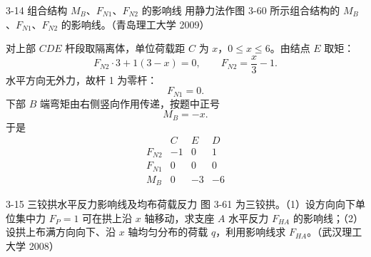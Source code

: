 \begin{problemcard}{3-14 组合结构 \(M_B\)、\(F_{N1}\)、\(F_{N2}\) 的影响线}
用静力法作图 3-60 所示组合结构的 \(M_B\)、\(F_{N1}\)、\(F_{N2}\) 的影响线。（青岛理工大学 2009）
\end{problemcard}

\begin{solutioncard}

对上部 \(CDE\) 杆段取隔离体，单位荷载距 \(C\) 为 \(x\)，\(0\le x\le6\)。由结点 \(E\) 取矩：
\[
  F_{N2}\cdot3+1(3-x)=0,
  \qquad
  F_{N2}=\frac{x}{3}-1.
\]
水平方向无外力，故杆 1 为零杆：
\[
  F_{N1}=0.
\]
下部 \(B\) 端弯矩由右侧竖向作用传递，按题中正号
\[
  M_B=-x.
\]
于是
\[
\begin{array}{c|ccc}
&C&E&D\\ \hline
F_{N2}&-1&0&1\\
F_{N1}&0&0&0\\
M_B&0&-3&-6
\end{array}
\]
\begin{figure}[H]
\centering
{}
\end{figure}
\end{solutioncard}

\begin{problemcard}{3-15 三铰拱水平反力影响线及均布荷载反力}
图 3-61 为三铰拱。（1）设方向向下单位集中力 \(F_P=1\) 可在拱上沿 \(x\) 轴移动，求支座 \(A\) 水平反力 \(F_{HA}\) 的影响线；（2）设拱上布满方向向下、沿 \(x\) 轴均匀分布的荷载 \(q\)，利用影响线求 \(F_{HA}\)。（武汉理工大学 2008）
\end{problemcard}

